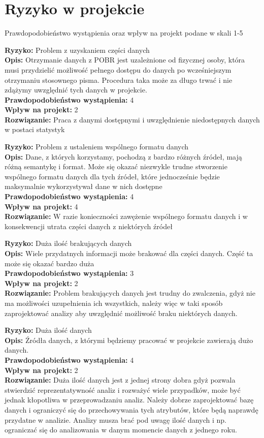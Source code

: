 \section{Ryzyko w projekcie}\label{ryzyko-w-projekcie}

Prawdopodobieństwo wystąpienia oraz wpływ na projekt podane w skali 1-5

\textbf{Ryzyko:} Problem z uzyskaniem części danych\\\textbf{Opis:}
Otrzymanie danych z POBR jest uzależnione od fizycznej osoby, która musi
przydzielić możliwość pełnego dostępu do danych po wcześniejszym
otrzymaniu stosownego pisma. Procedura taka może za długo trwać i nie
zdążymy uwzględnić tych danych w projekcie.\\\textbf{Prawdopodobieństwo
wystąpienia:} 4\\\textbf{Wpływ na projekt:} 2\\\textbf{Rozwiązanie:}
Praca z danymi dostępnymi i uwzględnienie niedostępnych danych w postaci
statystyk

\textbf{Ryzyko:} Problem z ustaleniem wspólnego formatu
danych\\\textbf{Opis:} Dane, z których korzystamy, pochodzą z bardzo
różnych źródeł, mają różną semantykę i format. Może się okazać niezwykle
trudne stworzenie wspólnego formatu danych dla tych źródeł, które
jednocześnie będzie maksymalnie wykorzystywał dane w nich
dostępne\\\textbf{Prawdopodobieństwo wystąpienia:} 4\\\textbf{Wpływ na
projekt:} 4\\\textbf{Rozwiązanie:} W razie konieczności zawężenie
wspólnego formatu danych i w konsekwencji utrata części danych z
niektórych źródeł

\textbf{Ryzyko:} Duża ilość brakujących danych\\\textbf{Opis:} Wiele
przydatnych informacji może brakować dla części danych. Część ta może
się okazać bardzo duża\\\textbf{Prawdopodobieństwo wystąpienia:}
3\\\textbf{Wpływ na projekt:} 2\\\textbf{Rozwiązanie:} Problem
brakujących danych jest trudny do zwalczenia, gdyż nie ma możliwości
uzupełnienia ich wszystkich, należy więc w taki sposób zaprojektować
analizy aby uwzględnić możliwość braku niektórych danych.

\textbf{Ryzyko:} Duża ilość danych\\\textbf{Opis:} Źródła danych, z
którymi będziemy pracować w projekcie zawierają dużo
danych.\\\textbf{Prawdopodobieństwo wystąpienia:} 4\\\textbf{Wpływ na
projekt:} 2\\\textbf{Rozwiązanie:} Duża ilość danych jest z jednej
strony dobra gdyż pozwala stwierdzić reprezentatywność analiz i rozważyć
wiele przypadków, może być jednak kłopotliwa w przeprowadzaniu analiz.
Należy dobrze zaprojektować bazę danych i ograniczyć się do
przechowywania tych atrybutów, które będą naprawdę przydatne w analizie.
Analizy musza brać pod uwagę ilość danych i np. ograniczać się do
analizowania w danym momencie danych z jednego roku.
